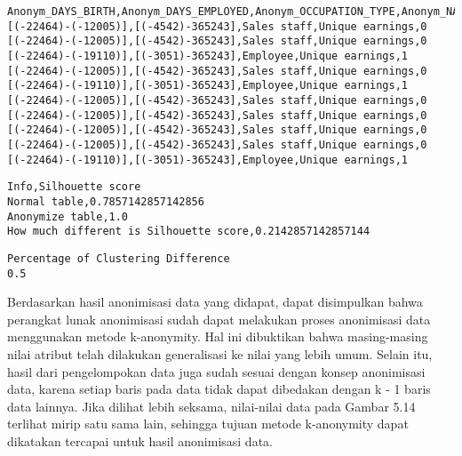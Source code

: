 \begin{lstlisting}[basicstyle=\ttfamily, frame=single,
	columns=fullflexible, keepspaces=true, breaklines=true, label=lst:fungsional_kmeans2, caption=Hasil Pengelompokan K-Means Setelah Anonimisasi]
Anonym_DAYS_BIRTH,Anonym_DAYS_EMPLOYED,Anonym_OCCUPATION_TYPE,Anonym_NAME_INCOME_TYPE,prediction
[(-22464)-(-12005)],[(-4542)-365243],Sales staff,Unique earnings,0
[(-22464)-(-12005)],[(-4542)-365243],Sales staff,Unique earnings,0
[(-22464)-(-19110)],[(-3051)-365243],Employee,Unique earnings,1
[(-22464)-(-12005)],[(-4542)-365243],Sales staff,Unique earnings,0
[(-22464)-(-19110)],[(-3051)-365243],Employee,Unique earnings,1
[(-22464)-(-12005)],[(-4542)-365243],Sales staff,Unique earnings,0
[(-22464)-(-12005)],[(-4542)-365243],Sales staff,Unique earnings,0
[(-22464)-(-12005)],[(-4542)-365243],Sales staff,Unique earnings,0
[(-22464)-(-12005)],[(-4542)-365243],Sales staff,Unique earnings,0
[(-22464)-(-19110)],[(-3051)-365243],Employee,Unique earnings,1
\end{lstlisting}

\begin{lstlisting}[basicstyle=\ttfamily, frame=single,
	columns=fullflexible, keepspaces=true, breaklines=true, label=lst:fungsional_kmeans3, caption=Perbedaan Silhouette Score]
Info,Silhouette score
Normal table,0.7857142857142856
Anonymize table,1.0
How much different is Silhouette score,0.2142857142857144
\end{lstlisting}

\begin{lstlisting}[basicstyle=\ttfamily, frame=single,
	columns=fullflexible, keepspaces=true, breaklines=true, label=lst:fungsional_kmeans4, caption=Perbedaan Persentase Hasil Pengelompokan (\%)]
Percentage of Clustering Difference
0.5
\end{lstlisting}

\vspace{0.5cm}
Berdasarkan hasil anonimisasi data yang didapat, dapat disimpulkan bahwa perangkat lunak anonimisasi sudah dapat melakukan proses anonimisasi data menggunakan metode k-anonymity. Hal ini dibuktikan bahwa masing-masing nilai atribut telah dilakukan generalisasi ke nilai yang lebih umum. Selain itu, hasil dari pengelompokan data juga sudah sesuai dengan konsep anonimisasi data, karena setiap baris pada data tidak dapat dibedakan dengan k - 1 baris data lainnya. Jika dilihat lebih seksama, nilai-nilai data pada Gambar 5.14 terlihat mirip satu sama lain, sehingga tujuan metode k-anonymity dapat dikatakan tercapai untuk hasil anonimisasi data.

